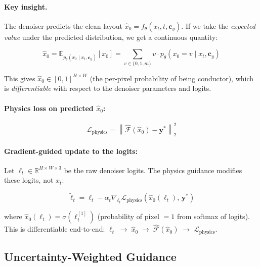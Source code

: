 \documentclass[12pt,a4paper]{article}
\newcommand{\ystar}{\mathbf{y}^{*}}
\newcommand{\cy}{\mathbf{c}_y}
\newcommand{\HW}{H \times W}
\theoremstyle{definition}
\theoremstyle{plain}
\theoremstyle{remark}
\begin{document}
\paragraph{Key insight.}
The denoiser predicts the clean layout $\hat{x}_0 = f_\theta(x_t, t, \cy)$.
If we take the \emph{expected value} under the predicted distribution, we get a
continuous quantity:

\begin{equation}
  \hat{x}_0 = \mathbb{E}_{p_\theta(x_0 \mid x_t, \cy)}[x_0]
  = \sum_{v \in \{0,1,m\}} v \cdot p_\theta(x_0 = v \mid x_t, \cy)
  \label{eq:x0hat}
\end{equation}

This gives $\hat{x}_0 \in [0,1]^{\HW}$ (the per-pixel probability of being conductor),
which is \emph{differentiable} with respect to the denoiser parameters and logits.

\paragraph{Physics loss on predicted $\hat{x}_0$:}

\begin{equation}
  \mathcal{L}_{\mathrm{physics}}
  = \left\|\hat{\mathcal{F}}(\hat{x}_0) - \ystar\right\|_2^2
  \label{eq:lphysics}
\end{equation}

\paragraph{Gradient-guided update to the logits:}

Let $\ell_t \in \mathbb{R}^{H \times W \times 3}$ be the raw denoiser logits.
The physics guidance modifies these logits, not $x_t$:

\begin{equation}
  \tilde{\ell}_t
  = \ell_t
  - \alpha_t \nabla_{\ell_t}
    \mathcal{L}_{\mathrm{physics}}\!\left(\hat{x}_0(\ell_t),\, \ystar\right)
  \label{eq:logit_guidance}
\end{equation}

where $\hat{x}_0(\ell_t) = \sigma(\ell_t^{[1]})$ (probability of pixel $= 1$ from
softmax of logits).
This is differentiable end-to-end:
$\ell_t \;\to\; \hat{x}_0 \;\to\; \hat{\mathcal{F}}(\hat{x}_0) \;\to\;
\mathcal{L}_{\mathrm{physics}}$.

\subsection{Uncertainty-Weighted Guidance}
\end{document}
